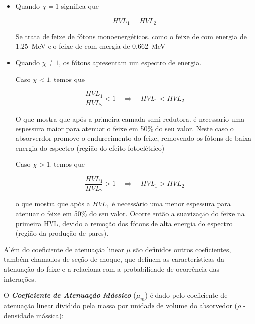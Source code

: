 \documentclass[11pt,a4paper]{article}
\begin{document}
                \begin{itemize}
                    \item Quando $\chi = 1$ significa que  
                    
                        $$HVL_1 = HVL_2$$ 
                    
                    \noindent Se trata de feixe de fótons monoenergéticos, como o feixe de  com energia de \qty{1.25}{MeV} e o feixe de  com energia de \qty{0.662}{MeV}
                    
                    \item Quando $\chi \neq  1$, os fótons apresentam um espectro de energia. 
                    
                    Caso $\chi <  1$, temos que

                        $$\frac{HVL_1}{HVL_2} < 1 \quad \Rightarrow \quad HVL_1 < HVL_2$$
                        

                    \noindent O que mostra que após a primeira camada semi-redutora, é necessario uma espessura maior para atenuar o feixe em 50\% do seu valor. Neste caso o absorverdor promove o endurecimento do feixe, removendo os fótons de baixa energia do espectro (região do efeito fotoelétrico) 

                    Caso $\chi >  1$, temos que

                        $$\frac{HVL_1}{HVL_2} > 1 \quad \Rightarrow \quad HVL_1 > HVL_2 $$
                        

                    \noindent o que mostra que após a $HVL_1$ é necessário uma menor espessura para atenuar o feixe em 50\% do seu valor. Ocorre então a suavização do feixe na primeira HVL, devido a remoção dos fótons de alta energia do espectro (região da produção de pares).

                \end{itemize}

            Além do coeficiente de atenuação linear $\mu$ são definidos outros coeficientes, também chamados de seção de choque, que definem as características da atenuação do feixe e a relaciona com a probabilidade de ocorrência das interações. 

            O \textbf{\textit{\textcolor{CarnationPink}{Coeficiente de Atenuação Mássico}}} ($\mu_m$) é dado pelo coeficiente de atenuação linear dividido pela massa por unidade de volume do absorvedor ($\rho$ - densidade mássica):
\end{document}

